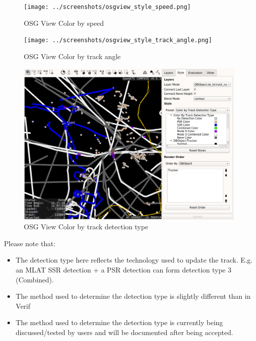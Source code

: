 \begin{figure}[H]
    \hspace*{-2.5cm}
    \texttt{[image: ../screenshots/osgview\_style\_speed.png]}
  \caption{OSG View Color by speed}
\end{figure}

\begin{figure}[H]
    \hspace*{-2.5cm}
    \texttt{[image: ../screenshots/osgview\_style\_track\_angle.png]}
  \caption{OSG View Color by track angle}
\end{figure}

\begin{figure}[H]
    \hspace*{-2.5cm}
    \includegraphics[width=19cm,frame]{../screenshots/osgview_style_tracker_detection_type.png}
  \caption{OSG View Color by track detection type}
\end{figure}

Please note that:
\begin{itemize}
 \item The detection type here reflects the technology used to update the track. E.g. an MLAT SSR detection + a PSR detection can form detection type 3 (Combined).
 \item The method used to determine the detection type is slightly different than in Verif
 \item The method used to determine the detection type is currently being discussed/tested by users and will be documented after being accepted.
\end{itemize}

